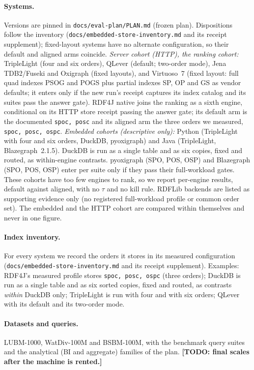 \documentclass[11pt]{article}
\newcommand{\todo}[1]{\textbf{[TODO: #1]}}
\begin{document}
\paragraph{Systems.} Versions are pinned in \texttt{docs/eval-plan/PLAN.md} (frozen plan). Dispositions follow the inventory
(\texttt{docs/embedded-store-inventory.md} and its receipt supplement); fixed-layout systems have no alternate configuration, so their
default and aligned arms coincide.
\emph{Server cohort (HTTP), the ranking cohort:} TripleLight (four and six orders), QLever (default; two-order mode), Jena TDB2/Fuseki and Oxigraph (fixed layouts),
and Virtuoso~7 (fixed layout: full quad indexes PSOG and POGS plus partial indexes SP, OP and GS as vendor defaults; it enters only if the new run's receipt captures its index catalog
and its suites pass the answer gate). RDF4J native joins the ranking as a sixth engine, conditional on its HTTP store receipt passing the answer gate; its default arm is the documented \texttt{spoc, posc} and its aligned arm the three orders we measured, \texttt{spoc, posc, ospc}.
\emph{Embedded cohorts (descriptive only):} Python (TripleLight with four and six orders, DuckDB, pyoxigraph) and Java (TripleLight, Blazegraph~2.1.5). DuckDB is run as a single table and as six copies, fixed and routed, as within-engine contrasts.
pyoxigraph (SPO, POS, OSP) and Blazegraph (SPO, POS, OSP) enter per suite only if they pass their full-workload gates. These cohorts have too few engines to rank, so we report per-engine results, default against aligned, with no $\tau$ and no kill rule. RDFLib backends are listed as supporting evidence only (no registered full-workload profile or common order set).
The embedded and the HTTP cohort are compared within themselves and never in one figure.

\paragraph{Index inventory.} For every system we record the orders it stores in its measured configuration
(\texttt{docs/embedded-store-inventory.md} and its receipt supplement). Examples: RDF4J's measured profile stores
\texttt{spoc, posc, ospc} (three orders); DuckDB is run as a single table and as six sorted copies, fixed and routed, as
contrasts \emph{within} DuckDB only; TripleLight is run with four and with six orders; QLever with its default and its two-order mode.

\paragraph{Datasets and queries.} LUBM-1000, WatDiv-100M and BSBM-100M, with the benchmark query suites and the analytical
(BI and aggregate) families of the plan. \todo{final scales after the machine is rented.}
\end{document}
